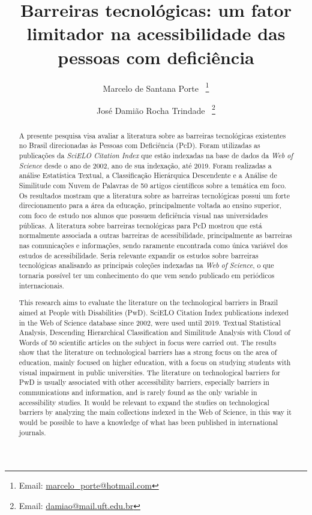 \documentclass{textolivre}
\title{Barreiras tecnológicas: um fator limitador na acessibilidade das pessoas com deficiência}
\author[1]{Marcelo de Santana Porte~\orcid{0000-0002-7271-6476} \thanks{Email: \url{marcelo_porte@hotmail.com}}}
\author[2]{José Damião Rocha Trindade~\orcid{0000-0002-5788-7517} \thanks{Email: \url{damiao@mail.uft.edu.br}}}
\affil[1]{Universidade Federal do Sul e Sudeste do Pará, Faculdade de Ciências Contábeis, Rondon do Pará, Pará, Brasil.}
\affil[2]{Universidade Federal do Tocantins, Programa de Pós-Graduação em Educação, Palmas, Tocantins, Brasil.}
\begin{document}
\maketitle

\begin{polyabstract}
\begin{abstract}
A presente pesquisa visa avaliar a literatura sobre as barreiras tecnológicas existentes no Brasil direcionadas às Pessoas com Deficiência (PcD). Foram utilizadas as publicações da \emph{SciELO Citation Index} que estão indexadas na base de dados da \emph{Web of Science} desde o ano de 2002, ano de sua indexação, até 2019. Foram realizadas a análise Estatística Textual, a Classificação Hierárquica Descendente e a Análise de Similitude com Nuvem de Palavras de 50 artigos científicos sobre a temática em foco. Os resultados mostram que a literatura sobre as barreiras tecnológicas possui um forte direcionamento para a área da educação, principalmente voltada ao ensino superior, com foco de estudo nos alunos que possuem deficiência visual nas universidades públicas. A literatura sobre barreiras tecnológicas para PcD mostrou que está normalmente associada a outras barreiras de acessibilidade, principalmente as barreiras nas comunicações e informações, sendo raramente encontrada como única variável dos estudos de acessibilidade. Seria relevante expandir os estudos sobre barreiras tecnológicas analisando as principais coleções indexadas na \emph{Web of Science}, o que tornaria possível ter um conhecimento do que vem sendo publicado em periódicos internacionais.

\end{abstract}

\begin{english}
\begin{abstract}
This research aims to evaluate the literature on the technological barriers in Brazil aimed at People with Disabilities (PwD). SciELO Citation Index publications indexed in the Web of Science database since 2002, were used until 2019. Textual Statistical Analysis, Descending Hierarchical Classification and Similitude Analysis with Cloud of Words of 50 scientific articles on the subject in focus were carried out. The results show that the literature on technological barriers has a strong focus on the area of education, mainly focused on higher education, with a focus on studying students with visual impairment in public universities. The literature on technological barriers for PwD is usually associated with other accessibility barriers, especially barriers in communications and information, and is rarely found as the only variable in accessibility studies. It would be relevant to expand the studies on technological barriers by analyzing the main collections indexed in the Web of Science, in this way it would be possible to have a knowledge of what has been published in international journals.


\end{abstract}
\end{english}
\end{polyabstract}
\end{document}
